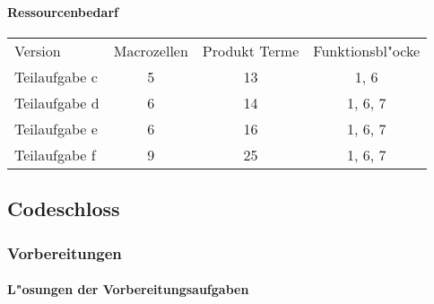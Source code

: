 \documentclass [] {scrartcl}
\begin{document}
  \paragraph{Ressourcenbedarf}
  \begin{table}
    \begin{tabular}{lccc}
      Version & Macrozellen & Produkt Terme & Funktionsbl"ocke\\
      Teilaufgabe c & 5 & 13 & 1, 6\\
      Teilaufgabe d & 6 & 14 & 1, 6, 7\\
      Teilaufgabe e & 6 & 16 & 1, 6, 7\\
      Teilaufgabe f & 9 & 25 & 1, 6, 7\\
    \end{tabular}
  \end{table}

  \subsection{Codeschloss}
  \subsubsection{Vorbereitungen}
  \paragraph{L"osungen der Vorbereitungsaufgaben}
\end{document}
